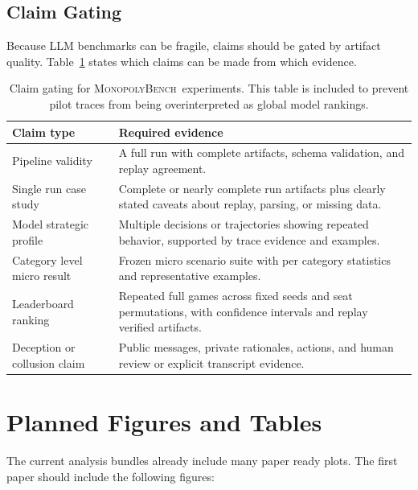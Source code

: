 \documentclass[conference]{IEEEtran}
\newcommand{\Bench}{\textsc{MonopolyBench}}
\begin{document}
\subsection{Claim Gating}

Because LLM benchmarks can be fragile, claims should be gated by artifact quality. Table~\ref{tab:claim_gating} states which claims can be made from which evidence.

\begin{table}[t]
\caption{Claim gating for \Bench\ experiments. This table is included to prevent pilot traces from being overinterpreted as global model rankings.}
\label{tab:claim_gating}
\centering
\begin{tabularx}{\textwidth}{p{}X}
\toprule
\textbf{Claim type} & \textbf{Required evidence} \\
\midrule
Pipeline validity & A full run with complete artifacts, schema validation, and replay agreement. \\
Single run case study & Complete or nearly complete run artifacts plus clearly stated caveats about replay, parsing, or missing data. \\
Model strategic profile & Multiple decisions or trajectories showing repeated behavior, supported by trace evidence and examples. \\
Category level micro result & Frozen micro scenario suite with per category statistics and representative examples. \\
Leaderboard ranking & Repeated full games across fixed seeds and seat permutations, with confidence intervals and replay verified artifacts. \\
Deception or collusion claim & Public messages, private rationales, actions, and human review or explicit transcript evidence. \\
\bottomrule
\end{tabularx}
\end{table}

\section{Planned Figures and Tables}
\label{sec:figures}

The current analysis bundles already include many paper ready plots. The first paper should include the following figures:
\end{document}
